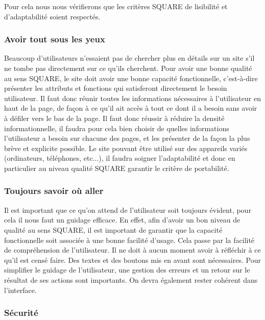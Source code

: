 \documentclass[a4paper,11pt]{article}
\begin{document}
Pour cela nous nous vérifierons que les critères SQUARE de lisibilité et d’adaptabilité soient respectés.\\

\subsubsection{Avoir tout sous les yeux}

Beaucoup d’utilisateurs n’essaient pas de chercher plus en détails sur un site s’il ne tombe pas
directement sur ce qu’ils cherchent. Pour avoir une bonne qualité au sens SQUARE, le site doit avoir
une bonne capacité fonctionnelle, c'est-à-dire présenter les attributs et fonctions qui satisferont
directement le besoin utilisateur. Il faut donc réunir toutes les informations nécessaires à l’utilisateur
en haut de la page, de façon à ce qu’il ait accès à tout ce dont il a besoin sans avoir à défiler vers le
bas de la page. Il faut donc réussir à réduire la densité informationnelle, il faudra pour cela bien choisir
de quelles informations l’utilisateur a besoin sur chacune des pages, et les présenter de la façon la
plus brève et explicite possible. Le site pouvant être utilisé sur des appareils variés (ordinateurs,
téléphones, etc...), il faudra soigner l’adaptabilité et donc en particulier au niveau qualité SQUARE
garantir le critère de portabilité.\\

\subsubsection{Toujours savoir où aller}

Il est important que ce qu’on attend de l’utilisateur soit toujours évident, pour cela il nous faut un
guidage efficace. En effet, afin d’avoir un bon niveau de qualité au sens SQUARE, il est important de
garantir que la capacité fonctionnelle soit associée à une bonne facilité d’usage. Cela passe par la
facilité de compréhension de l’utilisateur. Il ne doit à aucun moment avoir à réfléchir à ce qu’il est
censé faire. Des textes et des boutons mis en avant sont nécessaires. Pour simplifier le guidage de
l’utilisateur, une gestion des erreurs et un retour sur le résultat de ses actions sont importants. On
devra également rester cohérent dans l’interface.\\

\subsubsection{Sécurité}
\end{document}
